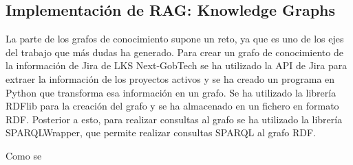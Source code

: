 \subsection{Implementación de RAG: Knowledge Graphs}
La parte de los grafos de conocimiento supone un reto, ya que es uno de los ejes del trabajo que más dudas ha generado. Para crear un grafo de conocimiento de la información de Jira de LKS Next-GobTech se ha utilizado la API de Jira para extraer la información de los proyectos activos y se ha creado un programa en Python que transforma esa información en un grafo. Se ha utilizado la librería RDFlib para la creación del grafo y se ha almacenado en un fichero en formato RDF. Posterior a esto, para realizar consultas al grafo se ha utilizado la librería SPARQLWrapper, que permite realizar consultas SPARQL al grafo RDF.

Como se 